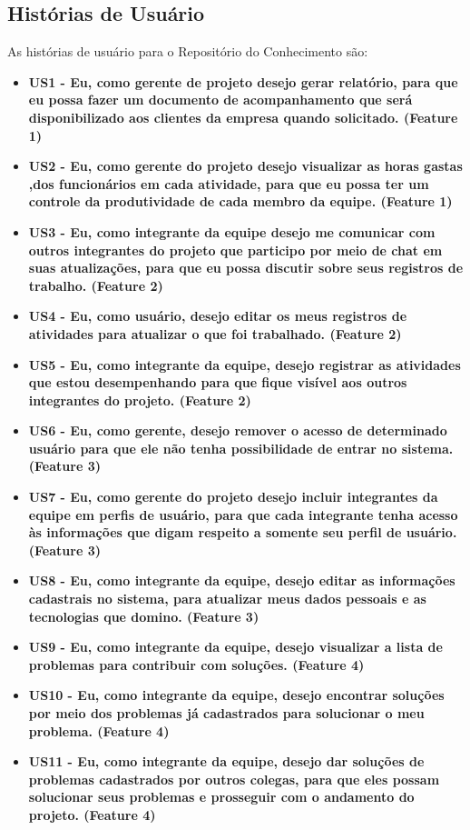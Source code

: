 \subsection{Histórias de Usuário}
As histórias de usuário para o Repositório do Conhecimento são:
\begin{itemize}
\item \textbf{US1 - Eu, como gerente de projeto desejo gerar relatório, para que eu possa fazer um documento de acompanhamento que será disponibilizado aos clientes da empresa quando solicitado. (Feature 1)}
\item \textbf{US2 - Eu, como gerente do projeto desejo visualizar as horas gastas ,dos funcionários em cada atividade, para que eu possa ter um controle da produtividade de cada membro da equipe. (Feature 1)}
\item \textbf{US3 - Eu, como integrante da equipe desejo me comunicar com outros integrantes do projeto que participo por meio de chat em suas atualizações, para que eu possa discutir sobre seus registros de trabalho. (Feature 2)}
\item \textbf{US4 - Eu, como usuário, desejo editar os meus registros de atividades para atualizar o que foi trabalhado. (Feature 2)}
\item \textbf{US5 - Eu, como integrante da equipe, desejo registrar as atividades que estou desempenhando para que fique visível aos outros integrantes do projeto. (Feature 2)}
\item \textbf{US6 - Eu, como gerente, desejo remover o acesso de determinado usuário para que ele não tenha possibilidade de entrar no sistema. (Feature 3)}
\item \textbf{US7 - Eu, como gerente do projeto desejo incluir integrantes da equipe em perfis de usuário, para que cada integrante tenha acesso às informações que digam respeito a somente seu perfil de usuário. (Feature 3)}
\item \textbf{US8 - Eu, como integrante da equipe, desejo editar as informações cadastrais no sistema, para atualizar meus dados pessoais e as tecnologias que domino. (Feature 3)}
\item \textbf{US9 - Eu, como integrante da equipe, desejo visualizar a lista de problemas para contribuir com soluções. (Feature 4)}
\item \textbf{US10 - Eu, como integrante da equipe, desejo encontrar soluções por meio dos problemas já cadastrados para solucionar o meu problema. (Feature 4)}
\item \textbf{US11 - Eu, como integrante da equipe, desejo dar soluções de problemas cadastrados por outros colegas, para que eles possam solucionar seus problemas e prosseguir com o andamento do projeto. (Feature 4)}

\end{itemize}
